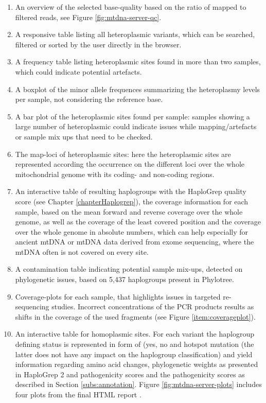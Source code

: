 \begin{enumerate}[label=\textbf{QC.\arabic*}]
\item An overview of the selected base-quality based on the ratio of mapped to filtered reads, see Figure \ref{fig:mtdna-server-qc}. 
\item A responsive table listing all heteroplasmic variants, which can be searched, filtered or sorted by the user directly in the browser. 
\item A frequency table listing heteroplasmic sites found in more than two samples, which could indicate potential artefacts. 
\item \label{item:boxplot} A boxplot of the minor allele frequences summarizing the heteroplasmy levels per sample, not considering the reference base.
\item \label{item:barplot}A bar plot of the heteroplasmic sites found per sample: samples showing a large number of heteroplasmic could indicate issues while mapping/artefacts or sample mix ups that need to be checked.  
\item \label{item:maplocus}The map-loci of heteroplasmic sites: here the heteroplasmic sites are represented according the occurrence on the different loci over the whole mitochondrial genome with its coding- and non-coding regions.
\item An interactive table of resulting haplogroups with the HaploGrep quality score (see Chapter \ref{chapterHaplogrep}), the coverage information for each sample, based on the mean forward and reverse coverage over the whole genome, as well as the coverage of the least covered position and the coverage over the whole genome in absolute numbers, which can help especially for ancient mtDNA or mtDNA data derived from exome sequencing, where the mtDNA often is not covered on every site. 
\item  A contamination table indicating potential sample mix-ups, detected on phylogenetic issues, based on 5,437 haplogroups present in Phylotree. 
\item \label{item:coverage} Coverage-plots for each sample, that highlights issues in targeted re-sequencing studies. Incorrect concentrations of the PCR products results as shifts in the coverage of the used fragments (see Figure \ref{item:coverageplot}). 
\item  An interactive table for homoplasmic sites. For each variant the haplogroup defining status is represented in form of (yes, no and hotspot mutation (the latter does not have any impact on the haplogroup classification) and yield information regarding amino acid changes, phylogenetic weights as presented in HaploGrep 2 and pathogenicity scores and the pathogenicity scores as described in Section \ref{subs:annotation}. Figure \ref{fig:mtdna-server-plots} includes four plots from the final HTML report \cite{Weissensteiner2016b}.
\end{enumerate}
